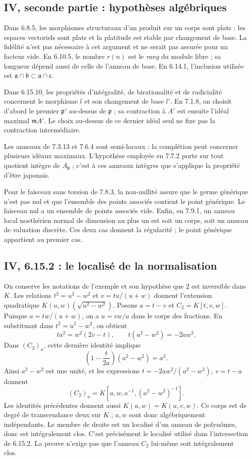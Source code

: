 \documentclass[11pt,a4paper]{article}
\begin{document}
\subsection{IV, seconde partie : hypothèses algébriques}
\label{note:iv2-flatness}
Dans 6.8.5, les morphismes structuraux d'un produit sur un corps sont
plats : les espaces vectoriels sont plats et la platitude est stable par
changement de base. La fidélité n'est pas nécessaire à cet argument et
ne serait pas assurée pour un facteur vide. En 6.10.5, le nombre $r(n)$
est le \emph{rang} du module libre ; sa longueur dépend aussi de celle
de l'anneau de base. En 6.14.1, l'inclusion utilisée est
$\mathfrak a\cap\mathfrak b\subset\mathfrak a\cap\mathfrak c$.

Dans 6.15.10, les propriétés d'intégralité, de birationalité et de
radicialité concernent le morphisme $l$ et son changement de base $l'$.
En 7.1.8, on choisit d'abord le premier $\mathfrak p'$ au-dessus de
$\mathfrak p$ ; sa contraction à $A'$ est ensuite l'idéal maximal
$\mathfrak mA'$. Le choix au-dessus de ce dernier idéal seul ne fixe pas
la contraction intermédiaire.

Les anneaux de 7.3.13 et 7.6.4 sont semi-locaux : la complétion peut
concerner plusieurs idéaux maximaux. L'hypothèse employée en 7.7.2 porte
sur tout quotient intègre de $A_{\mathfrak p}$ ; c'est à ces anneaux
intègres que s'applique la propriété d'être japonais.

Pour le faisceau sans torsion de 7.8.3, la non-nullité assure que le
germe générique n'est pas nul et que l'ensemble des points associés
contient le point générique. Le faisceau nul a un ensemble de points
associés vide. Enfin, en 7.9.1, un anneau local noethérien normal de
dimension au plus un est soit un corps, soit un anneau de valuation
discrète. Ces deux cas donnent la régularité ; le point générique
appartient au premier cas.

\subsection{IV, 6.15.2 : le localisé de la normalisation}
\label{note:iv2-normalization}
On conserve les notations de l'exemple et son hypothèse que $2$ est
inversible dans $K$. Les relations $t^2=u^2-w^2$ et $v=tu/(u+w)$
donnent l'extension quadratique $K(u,w)(\sqrt{u^2-w^2})$.
Posons $a=t-v$ et $C_2=K[t,v,w]$. Puisque $a=tw/(u+w)$,
on a $u=vw/a$ dans le corps des fractions. En substituant dans
$t^2=u^2-w^2$, on obtient
\[
 t a^2=w^2(2v-t),\qquad t(a^2-w^2)=-2aw^2.
\]
Dans $(C_2)_a$, cette dernière identité implique
\[
 \left(1-\frac{t}{2a}\right)(a^2-w^2)=a^2.
\]
Ainsi $a^2-w^2$ est une unité, et les expressions
$t=-2aw^2/(a^2-w^2)$, $v=t-a$ donnent
\[
 (C_2)_a=K[a,w,a^{-1},(a^2-w^2)^{-1}].
\]
Les identités précédentes donnent aussi $K(a,w)=K(u,v,w)$.
Ce corps est de degré de transcendance deux sur $K$ ; $a,w$ sont donc
algébriquement indépendants. Le membre de droite est un localisé d'un
anneau de polynômes, donc est intégralement clos. C'est précisément le
localisé utilisé dans l'intersection de 6.15.2. La preuve n'exige pas
que l'anneau $C_2$ lui-même soit intégralement clos.
\end{document}
